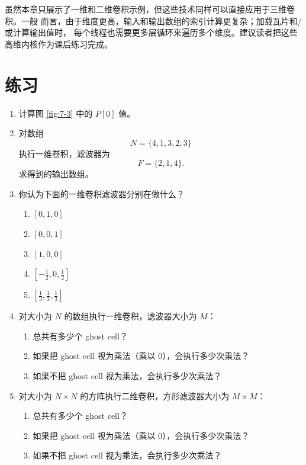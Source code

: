 虽然本章只展示了一维和二维卷积示例，但这些技术同样可以直接应用于三维卷积。一般
而言，由于维度更高，输入和输出数组的索引计算更复杂；加载瓦片和/或计算输出值时，
每个线程也需要更多层循环来遍历多个维度。建议读者把这些高维内核作为课后练习完成。

\section*{练习}

\begin{enumerate}[label=\arabic*.,leftmargin=2.7em]
  \item 计算图 \ref{fig:7-3} 中的 $P[0]$ 值。

  \item 对数组
  \[
    N=\{4,1,3,2,3\}
  \]
  执行一维卷积，滤波器为
  \[
    F=\{2,1,4\}.
  \]
  求得到的输出数组。

  \item 你认为下面的一维卷积滤波器分别在做什么？
  \begin{enumerate}[label=\alph*.,leftmargin=2.2em]
    \item $[0,1,0]$
    \item $[0,0,1]$
    \item $[1,0,0]$
    \item $\left[-\frac12,0,\frac12\right]$
    \item $\left[\frac13,\frac13,\frac13\right]$
  \end{enumerate}

  \item 对大小为 $N$ 的数组执行一维卷积，滤波器大小为 $M$：
  \begin{enumerate}[label=\alph*.,leftmargin=2.2em]
    \item 总共有多少个 ghost cell？
    \item 如果把 ghost cell 视为乘法（乘以 0），会执行多少次乘法？
    \item 如果不把 ghost cell 视为乘法，会执行多少次乘法？
  \end{enumerate}

  \item 对大小为 $N\times N$ 的方阵执行二维卷积，方形滤波器大小为 $M\times M$：
  \begin{enumerate}[label=\alph*.,leftmargin=2.2em]
    \item 总共有多少个 ghost cell？
    \item 如果把 ghost cell 视为乘法（乘以 0），会执行多少次乘法？
    \item 如果不把 ghost cell 视为乘法，会执行多少次乘法？
  \end{enumerate}


\end{enumerate}
